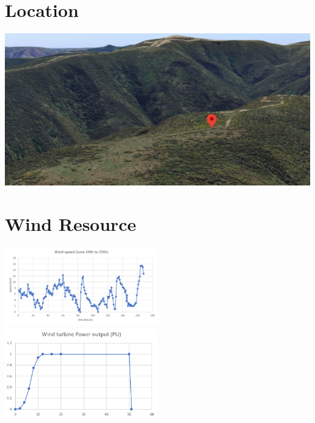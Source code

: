 \documentclass[journal]{IEEEtran}
\begin{document}
        \section{Location}
        \includegraphics[width=\textwidth]{fig/pin_location.png}
        \label{ap:location}
        \section{Wind Resource}
        \includegraphics[width=0.5\textwidth]{fig/windspeed.png}
        \includegraphics[width=0.5\textwidth]{fig/turbineresp.png}
        \label{ap:wind}
\end{document}
